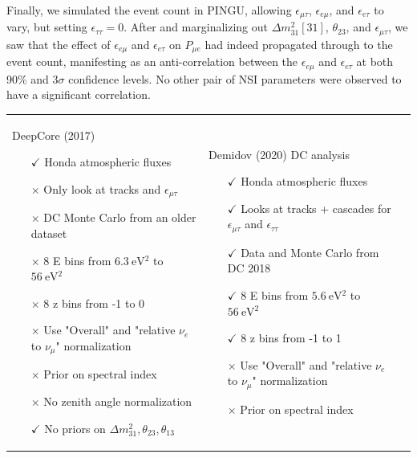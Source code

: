 \documentclass{article}
\newcommand{\emt}{\ensuremath{\epsilon_{\mu\tau}}}
\newcommand{\eet}{\epsilon_{e\tau}}
\newcommand{\eem}{\epsilon_{e\mu}}
\newcommand{\ett}{\ensuremath{\epsilon_{\tau\tau}}}
\renewcommand{\ne}{\nu_e}
\newcommand{\nm}{\nu_\mu}
\newcommand{\dm}{\Delta m^2_{31}}
\newcommand{\Pme}{P_{\mu  e}}
\begin{document}
{{Finally, we simulated the event count in PINGU, allowing $\emt$, $\eem$, and $\eet$ to vary, but setting $\ett=0$.
After and marginalizing out $\dm[31]$, $\theta_{23}$, and $\emt$, we saw that the effect of $\eem$ and $\eet$ on $\Pme$ had indeed propagated through to the event count,
manifesting as an anti-correlation between the $\eem$ and $\eet$ at both 90\% and $3\sigma$ confidence levels. No other pair of NSI parameters were observed to have 
a significant correlation.



\newpage
\begin{tabular}{p{55mm}p{55mm}p{55mm}}
   DeepCore (2017)
      \begin{itemize}
         \item[$\checkmark$] Honda atmospheric fluxes
         \item[$\times$] Only look at tracks and $\emt$
         \vspace{1em}  
         \item[$\times$] DC Monte Carlo from an older dataset 
         \item[$\times$] 8 E bins from $\SI{6.3}{\electronvolt^2}$ to $\SI{56}{\electronvolt^2}$
         \item[$\times$] 8 z bins from -1 to 0 
         \item[$\times$] Use "Overall" and "relative $\ne$ to $\nm$" normalization
         \item[$\times$] Prior on spectral index
         \item[$\times$] No zenith angle normalization
         \item[$\checkmark$] No priors on $\dm, \theta_{23},\theta_{13}$
      \end{itemize} &
    Demidov (2020) DC analysis
      \begin{itemize}
         \item[$\checkmark$] Honda atmospheric fluxes
         \item[$\checkmark$] Looks at tracks + cascades for $\emt$ and $\ett$
         \item[$\checkmark$] Data and Monte Carlo from DC 2018
         \item[$\checkmark$] 8 E bins from $\SI{5.6}{\electronvolt^2}   $ to $\SI{56}{\electronvolt^2}$
         \item[$\checkmark$] 8 z bins from -1 to 1
         \item[$\times$] Use "Overall" and "relative $\ne$ to $\nm$" normalization
         \item[$\times$] Prior on spectral index

\end{itemize}
\end{tabular}}}
\end{document}
